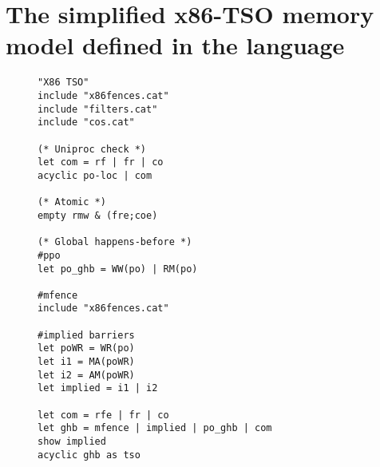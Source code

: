 \section{The simplified x86-TSO memory model defined in the \cat{} language~\cite{herd10tutorial}}
\label{apx:x86cat}

\begin{figure}[h]
\begin{lstlisting}
"X86 TSO"
include "x86fences.cat"
include "filters.cat"
include "cos.cat"

(* Uniproc check *)
let com = rf | fr | co
acyclic po-loc | com

(* Atomic *)
empty rmw & (fre;coe)

(* Global happens-before *)
#ppo
let po_ghb = WW(po) | RM(po)

#mfence
include "x86fences.cat"

#implied barriers
let poWR = WR(po)
let i1 = MA(poWR)
let i2 = AM(poWR)
let implied = i1 | i2

let com = rfe | fr | co
let ghb = mfence | implied | po_ghb | com
show implied
acyclic ghb as tso
\end{lstlisting}
\end{figure}